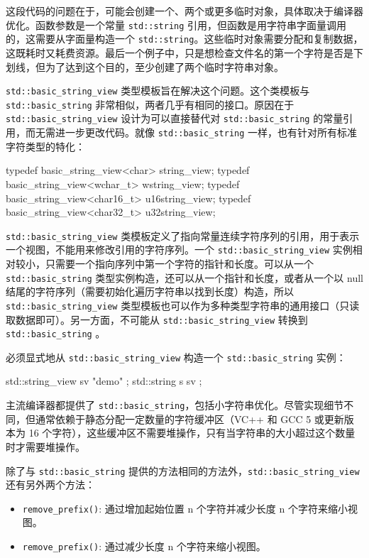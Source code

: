 这段代码的问题在于，可能会创建一个、两个或更多临时对象，具体取决于编译器优化。函数参数是一个常量 \verb|std::string| 引用，但函数是用字符串字面量调用的，这需要从字面量构造一个 \verb|std::string|。这些临时对象需要分配和复制数据，这既耗时又耗费资源。最后一个例子中，只是想检查文件名的第一个字符是否是下划线，但为了达到这个目的，至少创建了两个临时字符串对象。

\verb|std::basic_string_view| 类型模板旨在解决这个问题。这个类模板与 \verb|std::basic_string| 非常相似，两者几乎有相同的接口。原因在于 \verb|std::basic_string_view| 设计为可以直接替代对 \verb|std::basic_string| 的常量引用，而无需进一步更改代码。就像 \verb|std::basic_string| 一样，也有针对所有标准字符类型的特化：

\begin{cpp}
typedef basic_string_view<char>     string_view;
typedef basic_string_view<wchar_t>  wstring_view;
typedef basic_string_view<char16_t> u16string_view;
typedef basic_string_view<char32_t> u32string_view;
\end{cpp}

\verb|std::basic_string_view| 类模板定义了指向常量连续字符序列的引用，用于表示一个视图，不能用来修改引用的字符序列。一个 \verb|std::basic_string_view| 实例相对较小，只需要一个指向序列中第一个字符的指针和长度。可以从一个 \verb|std::basic_string| 类型实例构造，还可以从一个指针和长度，或者从一个以 null 结尾的字符序列（需要初始化遍历字符串以找到长度）构造，所以\verb|std::basic_string_view| 类型模板也可以作为多种类型字符串的通用接口（只读取数据即可）。另一方面，不可能从 \verb|std::basic_string_view| 转换到 \verb|std::basic_string| 。

必须显式地从 \verb|std::basic_string_view| 构造一个 \verb|std::basic_string| 实例：

\begin{cpp}
std::string_view sv{ "demo" };
std::string s{ sv };
\end{cpp}

\begin{myNotic}
主流编译器都提供了 \verb|std::basic_string|，包括小字符串优化。尽管实现细节不同，但通常依赖于静态分配一定数量的字符缓冲区（VC++ 和 GCC 5 或更新版本为 16 个字符），这些缓冲区不需要堆操作，只有当字符串的大小超过这个数量时才需要堆操作。
\end{myNotic}

除了与 \verb|std::basic_string| 提供的方法相同的方法外，\verb|std::basic_string_view| 还有另外两个方法：

\begin{itemize}
\item
\verb|remove_prefix()|: 通过增加起始位置 n 个字符并减少长度 n 个字符来缩小视图。

\item
\verb|remove_prefix()|: 通过减少长度 n 个字符来缩小视图。
\end{itemize}

